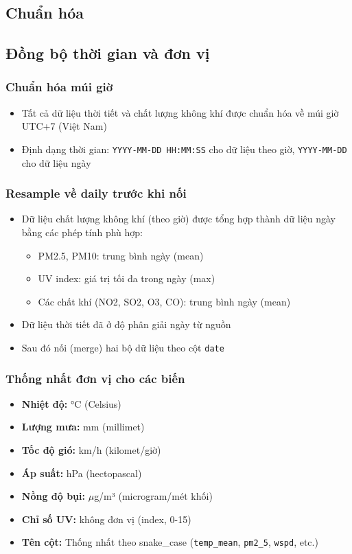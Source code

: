 \documentclass[12pt,a4paper]{article}
\begin{document}
\subsection{Chuẩn hóa}

\subsection{Đồng bộ thời gian và đơn vị}

\subsubsection{Chuẩn hóa múi giờ}
\begin{itemize}
    \item Tất cả dữ liệu thời tiết và chất lượng không khí được chuẩn hóa về múi giờ UTC+7 (Việt Nam)
    \item Định dạng thời gian: \texttt{YYYY-MM-DD HH:MM:SS} cho dữ liệu theo giờ, \texttt{YYYY-MM-DD} cho dữ liệu ngày
\end{itemize}

\subsubsection{Resample về daily trước khi nối}
\begin{itemize}
    \item Dữ liệu chất lượng không khí (theo giờ) được tổng hợp thành dữ liệu ngày bằng các phép tính phù hợp:
    \begin{itemize}
        \item PM2.5, PM10: trung bình ngày (mean)
        \item UV index: giá trị tối đa trong ngày (max)
        \item Các chất khí (NO2, SO2, O3, CO): trung bình ngày (mean)
    \end{itemize}
    \item Dữ liệu thời tiết đã ở độ phân giải ngày từ nguồn
    \item Sau đó nối (merge) hai bộ dữ liệu theo cột \texttt{date}
\end{itemize}

\subsubsection{Thống nhất đơn vị cho các biến}
\begin{itemize}
    \item \textbf{Nhiệt độ:} °C (Celsius)
    \item \textbf{Lượng mưa:} mm (millimet)
    \item \textbf{Tốc độ gió:} km/h (kilomet/giờ)
    \item \textbf{Áp suất:} hPa (hectopascal)
    \item \textbf{Nồng độ bụi:} $\mu$g/m³ (microgram/mét khối)
    \item \textbf{Chỉ số UV:} không đơn vị (index, 0-15)
    \item \textbf{Tên cột:} Thống nhất theo snake\_case (\texttt{temp\_mean}, \texttt{pm2\_5}, \texttt{wspd}, etc.)
\end{itemize}
\end{document}
